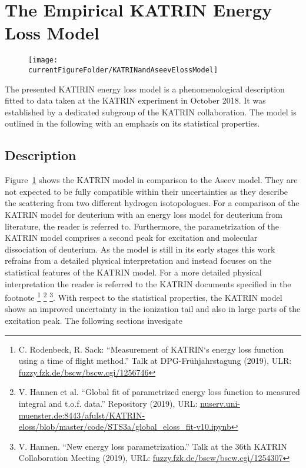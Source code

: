 \section{The Empirical KATRIN Energy Loss Model}
\label{sec:katrinElossModel}
\begin{figure}[tbh]
	\centering
	\texttt{[image: \\currentFigureFolder/KATRINandAseevElossModel]}
	\label{fig:katrinElossElossModel}
\end{figure}
The presented KATIRIN energy loss model is a phenomenological description fitted to data taken at the KATRIN experiment in October 2018. It was established by a dedicated subgroup of the KATRIN collaboration. The model is outlined in the following with an emphasis on its statistical properties.

\subsection{Description}
Figure~\ref{fig:katrinElossElossModel} shows the KATRIN model in comparison to the Aseev model. They are not expected to be fully compatible within their uncertainties as they describe the scattering from two different hydrogen isotopologues. For a comparison of the KATRIN model for deuterium with an energy loss model for deuterium from literature, the reader is referred to\footnotemark[1]. Furthermore, the parametrization of the KATRIN model comprises a second peak for excitation and molecular dissociation of deuterium. As the model is still in its early stages this work refrains from a detailed physical interpretation and instead focuses on the statistical features of the KATRIN model. For a more detailed physical interpretation the reader is referred to the KATRIN documents specified in the footnote
\footnote{\label{footnoteKatrinElossDPG}
	C. Rodenbeck, R. Sack: ``Measurement of KATRIN‘s
	energy loss function using a time of flight method.'' Talk at DPG-Frühjahrstagung (2019), ULR: \url{fuzzy.fzk.de/bscw/bscw.cgi/1256746}}
\footnote{
	V. Hannen et al. ``Global fit of parametrized energy loss function to measured integral and t.o.f. data.'' Repository (2019), URL: \url{nuserv.uni-muenster.de:8443/afulst/KATRIN-eloss/blob/master/code/STS3a/global_eloss_fit-v10.ipynb} }
\footnote{V. Hannen. ``New energy loss parametrization.'' Talk at the 36th KATRIN Collaboration Meeting (2019), URL: \url{fuzzy.fzk.de/bscw/bscw.cgi/1254307}}.
With respect to the statistical properties, the KATRIN model shows an improved uncertainty in the ionization tail and also in large parts of the excitation peak. The following sections invesigate


